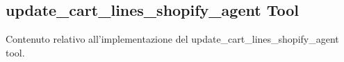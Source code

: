 \subsection{update\_cart\_lines\_shopify\_agent Tool}

Contenuto relativo all'implementazione del update\_cart\_lines\_shopify\_agent tool.
